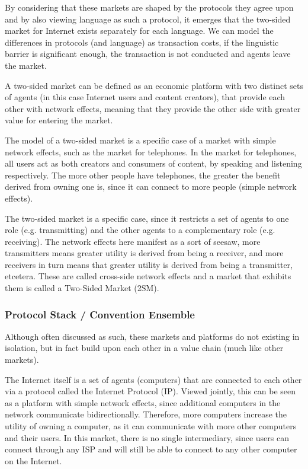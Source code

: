 \documentclass[a4paper,british]{article}\usepackage[]{graphicx}\usepackage[]{xcolor}
\begin{document}
By considering that these markets are shaped by the protocols they
agree upon and by also viewing language as such a protocol, it emerges
that the two-sided market for Internet exists separately for each
language. We can model the differences in protocols (and language)
as transaction costs, if the linguistic barrier is significant enough,
the transaction is not conducted and agents leave the market.

A two-sided market can be defined as an economic platform with two
distinct sets of agents (in this case Internet users and content creators),
that provide each other with network effects, meaning that they provide
the other side with greater value for entering the market. 

The model of a two-sided market is a specific case of a market with
simple network effects, such as the market for telephones. In the
market for telephones, all users act as both creators and consumers
of content, by speaking and listening respectively. The more other
people have telephones, the greater the benefit derived from owning
one is, since it can connect to more people (simple network effects).

The two-sided market is a specific case, since it restricts a set
of agents to one role (e.g. transmitting) and the other agents to
a complementary role (e.g. receiving). The network effects here manifest
as a sort of seesaw, more transmitters means greater utility is derived
from being a receiver, and more receivers in turn means that greater
utility is derived from being a transmitter, etcetera. These are called
cross-side network effects and a market that exhibits them is called
a Two-Sided Market (2SM). 

\subsubsection*{Protocol Stack / Convention Ensemble}

Although often discussed as such, these markets and platforms do not
existing in isolation, but in fact build upon each other in a value
chain (much like other markets).

The Internet itself is a set of agents (computers) that are connected
to each other via a protocol called the Internet Protocol (IP). Viewed
jointly, this can be seen as a platform with simple network effects,
since additional computers in the network communicate bidirectionally.
Therefore, more computers increase the utility of owning a computer,
as it can communicate with more other computers and their users. In
this market, there is no single intermediary, since users can connect
through any ISP and will still be able to connect to any other computer
on the Internet.
\end{document}
